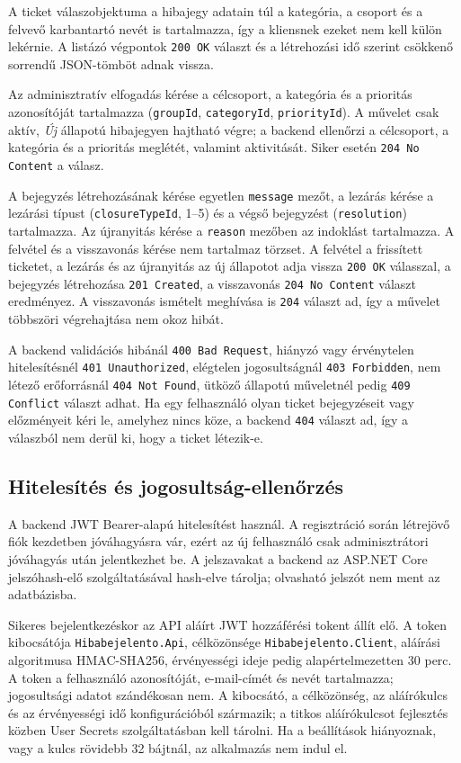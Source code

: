 \documentclass[12pt, a4paper, twoside]{article}
\begin{document}
A ticket válaszobjektuma a hibajegy adatain túl a kategória, a csoport és a felvevő karbantartó nevét is tartalmazza, így a kliensnek ezeket nem kell külön lekérnie. A listázó végpontok \texttt{200 OK} választ és a létrehozási idő szerint csökkenő sorrendű JSON-tömböt adnak vissza.

Az adminisztratív elfogadás kérése a célcsoport, a kategória és a prioritás azonosítóját tartalmazza (\texttt{groupId}, \texttt{categoryId}, \texttt{priorityId}). A művelet csak aktív, \textit{Új} állapotú hibajegyen hajtható végre; a backend ellenőrzi a célcsoport, a kategória és a prioritás meglétét, valamint aktivitását. Siker esetén \texttt{204 No Content} a válasz.

A bejegyzés létrehozásának kérése egyetlen \texttt{message} mezőt, a lezárás kérése a lezárási típust (\texttt{closureTypeId}, 1--5) és a végső bejegyzést (\texttt{resolution}) tartalmazza. 
Az újranyitás kérése a \texttt{reason} mezőben az indoklást tartalmazza. A felvétel és a visszavonás kérése nem tartalmaz törzset. A felvétel a frissített ticketet, a lezárás és az újranyitás az új állapotot adja vissza \texttt{200 OK} válasszal, a bejegyzés létrehozása \texttt{201 Created}, a visszavonás \texttt{204 No Content} választ eredményez. A visszavonás ismételt meghívása is \texttt{204} választ ad, így a művelet többszöri végrehajtása nem okoz hibát.

A backend validációs hibánál \texttt{400 Bad Request}, hiányzó vagy érvénytelen hitelesítésnél \texttt{401 Unauthorized}, elégtelen jogosultságnál \texttt{403 Forbidden}, nem létező erőforrásnál \texttt{404 Not Found}, ütköző állapotú műveletnél pedig \texttt{409 Conflict} választ adhat. Ha egy felhasználó olyan ticket bejegyzéseit vagy előzményeit kéri le, amelyhez nincs köze, a backend \texttt{404} választ ad, így a válaszból nem derül ki, hogy a ticket létezik-e.

\subsection{Hitelesítés és jogosultság-ellenőrzés}

A backend JWT Bearer-alapú hitelesítést használ. A regisztráció során létrejövő fiók kezdetben jóváhagyásra vár, ezért az új felhasználó csak adminisztrátori jóváhagyás után jelentkezhet be. A jelszavakat a backend az ASP.NET Core jelszóhash-elő szolgáltatásával hash-elve tárolja; olvasható jelszót nem ment az adatbázisba.

Sikeres bejelentkezéskor az API aláírt JWT hozzáférési tokent állít elő. A token kibocsátója \texttt{Hibabejelento.Api}, célközönsége \texttt{Hibabejelento.Client}, aláírási algoritmusa HMAC-SHA256, érvényességi ideje pedig alapértelmezetten 30 perc. A token a felhasználó azonosítóját, e-mail-címét és nevét tartalmazza; jogosultsági adatot szándékosan nem. A kibocsátó, a célközönség, az aláírókulcs és az érvényességi idő konfigurációból származik; a titkos aláírókulcsot fejlesztés közben User Secrets szolgáltatásban kell tárolni. Ha a beállítások hiányoznak, vagy a kulcs rövidebb 32 bájtnál, az alkalmazás nem indul el.
\end{document}
